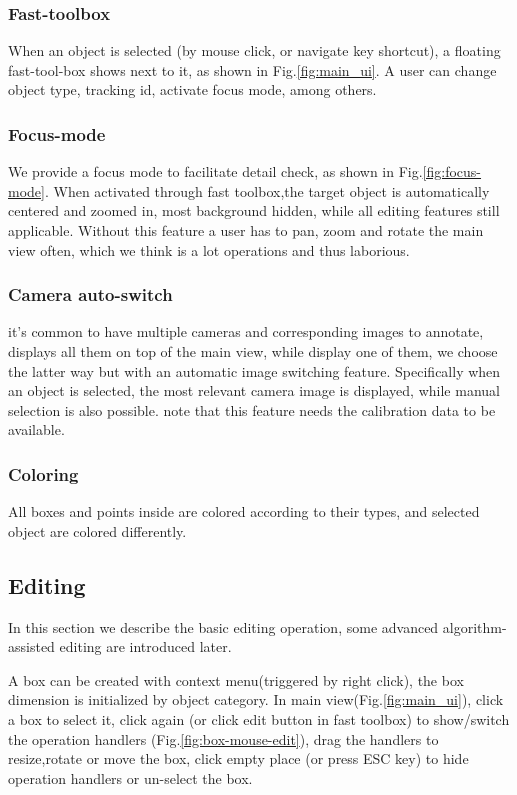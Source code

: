 \documentclass[letterpaper, 10 pt, conference]{ieeeconf}  %
\begin{document}
\subsubsection{Fast-toolbox}
When an object is selected (by mouse click, or navigate key shortcut), a floating fast-tool-box shows next to it, as shown in Fig.\ref{fig:main_ui}. A user can change object type, tracking id, activate focus mode, among others.

\subsubsection{Focus-mode}
We provide a focus mode to facilitate detail check, as shown in Fig.\ref{fig:focus-mode}. When activated through fast toolbox,the target object is automatically centered and zoomed in, most background hidden, while all editing features still applicable. Without this feature a user has to pan,  zoom and rotate the main view often, which we think is a lot operations and thus laborious.
\subsubsection{Camera auto-switch}
it's common to have multiple cameras and corresponding images to annotate, \cite{Zimmer20193DBA} displays all them on top of the main view, while \cite{} display one of them, we choose the latter way but with an automatic image switching feature. Specifically when an object is selected, the most relevant camera image is displayed, while manual selection is also possible.
note that this feature needs the calibration data to be available.

\subsubsection{Coloring}
All boxes and points inside are colored according to their types, and selected object are colored differently.

\subsection{Editing}
In this section we describe the basic editing operation, some advanced algorithm-assisted editing are introduced later.


A box can be created with context menu(triggered by right click), the box dimension is initialized by object category. In main view(Fig.\ref{fig:main_ui}), click a box to select it, click again (or click edit button in fast toolbox) to show/switch the operation handlers (Fig.\ref{fig:box-mouse-edit}), drag the handlers to resize,rotate or move the box, click empty place (or press ESC key) to hide operation handlers or un-select the box.
\end{document}
